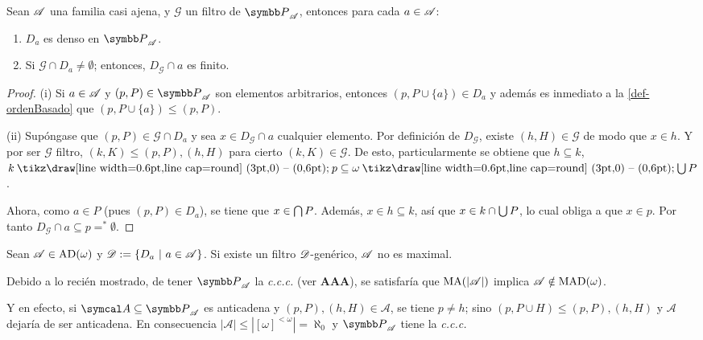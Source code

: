  \begin{lema}\label{lem-DgMagia}
  Sean $\mathscr{A}$ una familia casi ajena, y $\mathcal{G}$ un filtro de $\mathbb{P}_\ms{A}$, entonces para cada $a \in \mathscr{A}$:
  \begin{enumerate}
   \item $D_a$ es denso en $\mathbb{P}_\ms{A}$.
   \item Si $\mathcal{G} \cap D_a \neq \emptyset$; entonces, $D_\mathcal{G} \cap a$ es finito.
  \end{enumerate}
 \end{lema}

 \begin{proof}
  (i) Si $a \in \mathscr{A}$ y $(p,P) \in \mathbb{P}_\ms{A}$ son elementos arbitrarios, entonces $(p,P\cup\{a\}) \in D_a$ y además es inmediato a la \autoref{def-ordenBasado} que $(p,P\cup\{a\}) \leq (p,P)$.

  (ii) Supóngase que $(p,P) \in \mathcal{G} \cap D_a$ y sea $x \in D_\mathcal{G} \cap a$ cualquier elemento. Por definición de $D_\mathcal{G}$, existe $(h,H) \in \mathcal{G}$ de modo que $x \in h$. Y por ser $\mathcal{G}$ filtro, $(k,K) \leq (p,P),(h,H)$ para cierto $(k,K) \in \mathcal{G}$. De esto, particularmente se obtiene que $h \subseteq k$, $k \setminus p \subseteq \omega \setminus \midcup P$.

  Ahora, como $a \in P$ (pues $(p,P)\in D_a$), se tiene que $x \in \mbox{$\bigcap$}\, P$. Además, $x \in h \subseteq k$, así que $x \in k \cap \mbox{$\bigcup$}\, P$, lo cual obliga a que $x \in p$. Por tanto $D_\mathcal{G} \cap a \subseteq p =^* \emptyset$.
 \end{proof}

 \begin{corolario}\label{cor-SolovayDebil}
  Sean $\mathscr{A} \in \operatorname{AD}(\omega)$ y $\mathscr{D}:=\{D_a \text{ $|$ } a \in \mathscr{A}\}$. Si existe un filtro $\mathscr{D}$-genérico, $\mathscr{A}$ no es maximal.
 \end{corolario}

 Debido a lo recién mostrado, de tener $\mathbb{P}_\ms{A}$ la \textit{c.c.c.} (ver \textbf{AAA}), se satisfaría que $\operatorname{MA}(|\mathscr{A}|)$ implica $\mathscr{A} \notin \operatorname{MAD}(\omega)$.

 Y en efecto, si $\mathcal{A} \subseteq \mathbb{P}_\ms{A}$ es anticadena y $(p,P),(h,H) \in \mathcal{A}$, se tiene $p\neq h$; sino $(p,P \cup H) \leq (p,P),(h,H)$ y $\mathcal{A}$ dejaría de ser anticadena. En consecuencia $|\mathcal{A}|\leq|[\omega]^{<\omega}|=\aleph_0$ y $\mathbb{P}_\ms{A}$ tiene la \textit{c.c.c.}

